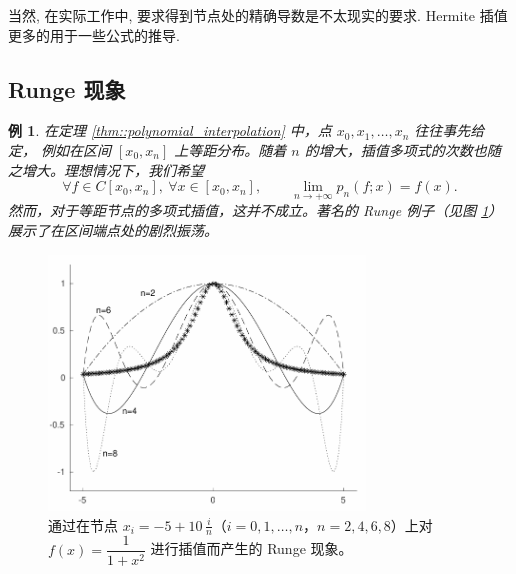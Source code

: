 \documentclass[a4paper]{ctexart}
\newtheorem{example}[theorem]{例}
\numberwithin{theorem}{section}
\numberwithin{equation}{section}
\numberwithin{figure}{section}
\numberwithin{remark}{section}
\begin{document}
当然, 在实际工作中, 要求得到节点处的精确导数是不太现实的要求. Hermite 插值
更多的用于一些公式的推导.


\subsection{Runge 现象}

\begin{example}
    \label{exp::runge}
在定理 \ref{thm::polynomial_interpolation} 中，点 $x_0,x_1,\ldots,x_n$ 往往事先给定，
例如在区间 $[x_0,x_n]$ 上等距分布。随着 $n$ 的增大，插值多项式的次数也随之增大。理想情况下，我们希望
\begin{equation}
    \label{eq::runge}
\forall f\in C[x_0,x_n],\ \forall x\in[x_0,x_n],\qquad
\lim_{n\to+\infty} p_n(f;x)=f(x).
\end{equation}
然而，对于等距节点的多项式插值，这并不成立。著名的 Runge 例子（见图 \ref{fig::runge}）展示了在区间端点处的剧烈振荡。
\end{example}

\begin{figure}
    \centering
    \includegraphics[width=0.75\textwidth]{images/Runge.png}
    \caption{通过在节点 $x_i=-5+10\,\tfrac{i}{n}$（$i=0,1,\ldots,n$，$n=2,4,6,8$）上对
$f(x)=\dfrac{1}{1+x^{2}}$ 进行插值而产生的 Runge 现象。}
    \label{fig::runge}
\end{figure}
\end{document}
